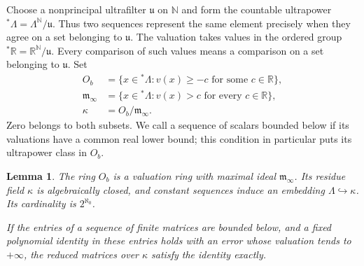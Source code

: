 \documentclass[11pt]{article}
\numberwithin{equation}{section}
\newtheorem{lemma}[theorem]{Lemma}
\theoremstyle{definition}
\theoremstyle{remark}
\begin{document}
Choose a nonprincipal ultrafilter $\mathfrak u$ on $\mathbb N$ and form the
countable ultrapower ${}^*\Lambda=\Lambda^{\mathbb N}/\mathfrak u$.
Thus two sequences represent the same element precisely when they
agree on a set belonging to $\mathfrak u$.  The valuation takes values
in the ordered group ${}^*\mathbb R=\mathbb R^{\mathbb N}/\mathfrak u$.  Every comparison
of such values means a comparison on a set belonging to
$\mathfrak u$.  Set
\begin{align}
 O_b&=\{x\in{}^*\Lambda:v(x)\ge-c
                         \text{ for some }c\in\mathbb R\},\nonumber\\
 \mathfrak m_\infty&=\{x\in{}^*\Lambda:v(x)>c
                         \text{ for every }c\in\mathbb R\},\nonumber\\
 \kappa&=O_b/\mathfrak m_\infty.
 \label{eq:field-residue}
\end{align}
Zero belongs to both subsets.  We call a sequence of scalars bounded
below if its valuations have a common real lower bound; this condition
in particular puts its ultrapower class in $O_b$.

\begin{lemma}\label{lem:coarsened-field}
The ring $O_b$ is a valuation ring with maximal ideal
$\mathfrak m_\infty$.  Its residue field $\kappa$ is algebraically
closed, and constant sequences induce an embedding
$\Lambda\hookrightarrow\kappa$.  Its cardinality is $2^{\aleph_0}$.

If the entries of a sequence of finite matrices are bounded below,
and a fixed polynomial identity in these entries holds with an error
whose valuation tends to $+\infty$, the reduced matrices over $\kappa$
satisfy the identity exactly.
\end{lemma}
\end{document}
